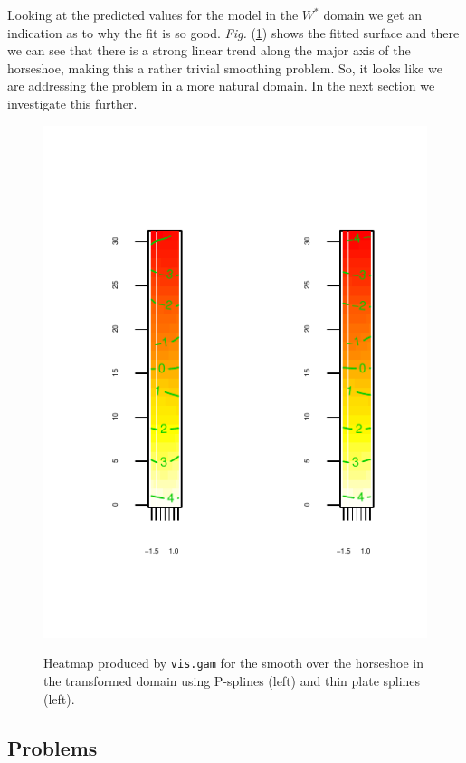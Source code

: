 \documentclass[a4paper,10pt]{amsart}
\newcommand{\Fig}[1]{\emph{Fig.} (\ref{#1})}
\begin{document}
Looking at the predicted values for the model in the $W^*$ domain we get an indication as to why the fit is so good. \Fig{hsvisgam} shows the fitted surface and there we can see that there is a strong linear trend along the major axis of the horseshoe, making this a rather trivial smoothing problem. So, it looks like we are addressing the problem in a more natural domain. In the next section we investigate this further.

\begin{figure}
\centering
\includegraphics[trim=0in 0.5in 0in 0in]{figs/hsvisgam.pdf} \\
\caption{Heatmap produced by \texttt{vis.gam} for the smooth over the horseshoe in the transformed domain using P-splines (left) and thin plate splines (left).}
\label{hsvisgam}
\end{figure}

\subsection{Problems}
\end{document}
